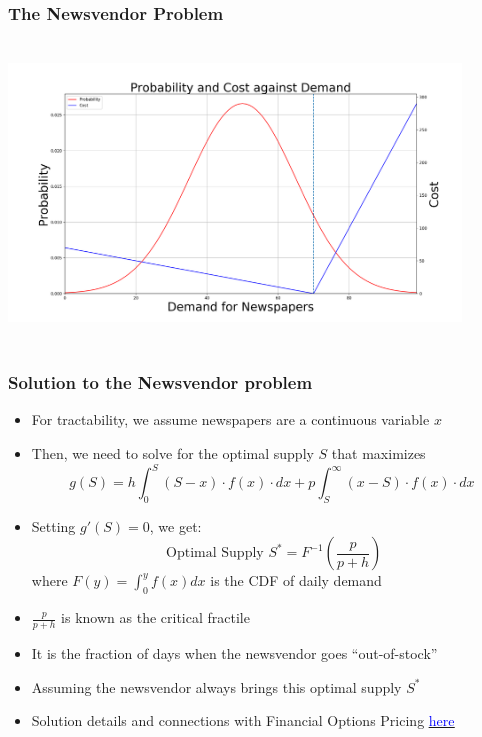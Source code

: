 \documentclass[handout]{beamer}
\begin{document}
\begin{frame}
\frametitle{The Newsvendor Problem}
\includegraphics[width=12cm, height=8cm]{newsvendor.png}
\end{frame}

\begin{frame}
\frametitle{Solution to the Newsvendor problem}
\pause
\begin{itemize}[<+->]
\item For tractability, we assume newspapers are a continuous variable $x$
\item Then, we need to solve for the optimal supply $S$ that maximizes
$$g(S) = h \int_0^S (S-x) \cdot f(x) \cdot dx + p \int_S^{\infty} (x-S) \cdot f(x) \cdot dx$$
\item Setting $g'(S) =0$, we get:
$$\mbox{ Optimal Supply } S^* = F^{-1}(\frac p {p+h})$$
where $F(y) = \int_0^y f(x) dx$ is the CDF of daily demand
\item $\frac p {p+h}$ is known as the critical fractile
\item It is the fraction of days when the newsvendor goes ``out-of-stock''
\item Assuming the newsvendor always brings this optimal supply $S^*$
\item Solution details and connections with Financial Options Pricing \href{https://github.com/coverdrive/technical-documents/blob/master/supply_chain/NewsvendorOptionsPricing/NewsvendorOptionsPricing.pdf}{\underline{\textcolor{blue}{here}}}
\end{itemize}
\end{frame}
\end{document}
